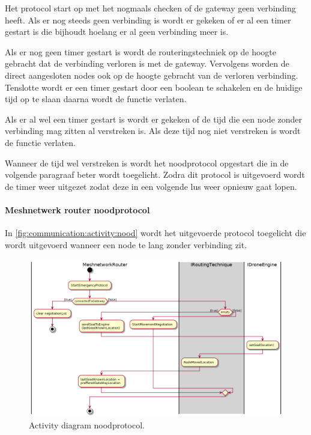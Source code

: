 \documentclass[a4paper, 11pt, oneside]{report}
\begin{document}
Het protocol start op met het nogmaals checken of de gateway geen verbinding heeft.
Als er nog steeds geen verbinding is wordt er gekeken of er al een timer gestart is die bijhoudt hoelang er al geen verbinding meer is.

Als er nog geen timer gestart is wordt de routeringstechniek op de hoogte gebracht dat de verbinding verloren is met de gateway.
Vervolgens worden de direct aangesloten nodes ook op de hoogte gebracht van de verloren verbinding.
Tenslotte  wordt er een timer gestart door een boolean te schakelen en de huidige tijd op te slaan daarna wordt de functie verlaten.

Als er al wel een timer gestart is wordt er gekeken of de tijd die een node zonder verbinding mag zitten al verstreken is.
Als deze tijd nog niet verstreken is wordt de functie verlaten.

Wanneer de tijd wel verstreken is wordt het noodprotocol opgestart die in de volgende paragraaf beter wordt toegelicht.
Zodra dit protocol is uitgevoerd wordt de timer weer uitgezet zodat deze in een volgende lus weer opnieuw gaat lopen.
\pagebreak
\paragraph{Meshnetwerk router noodprotocol}
In \autoref{fig:communication:activity:nood} wordt het uitgevoerde protocol toegelicht die wordt uitgevoerd wanneer een node te lang zonder verbinding zit.

\begin{figure}[H]
	\begin{center}\includegraphics[width=\linewidth]{UML/out/Communication/activity/EmergencyProtocol/EmergencyProtocol.png}\end{center}
	\caption{Activity diagram noodprotocol.}
	\label{fig:communication:activity:nood}
\end{figure}
\end{document}

